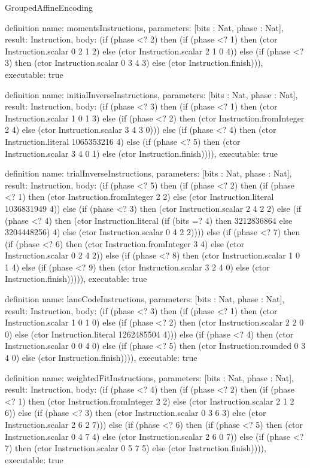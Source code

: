 \begin{lexlean}{GroupedAffineEncoding}
\begin{semanticmodule}
definition{
  name: momentsInstructions,
  parameters: [bits : Nat, phase : Nat],
  result: Instruction,
  body: (if (phase <? 2) then (if (phase <? 1) then (ctor Instruction.scalar 0 2 1 2) else (ctor Instruction.scalar 2 1 0 4)) else (if (phase <? 3) then (ctor Instruction.scalar 0 3 4 3) else (ctor Instruction.finish))),
  executable: true
}

definition{
  name: initialInverseInstructions,
  parameters: [bits : Nat, phase : Nat],
  result: Instruction,
  body: (if (phase <? 3) then (if (phase <? 1) then (ctor Instruction.scalar 1 0 1 3) else (if (phase <? 2) then (ctor Instruction.fromInteger 2 4) else (ctor Instruction.scalar 3 4 3 0))) else (if (phase <? 4) then (ctor Instruction.literal 1065353216 4) else (if (phase <? 5) then (ctor Instruction.scalar 3 4 0 1) else (ctor Instruction.finish)))),
  executable: true
}

definition{
  name: trialInverseInstructions,
  parameters: [bits : Nat, phase : Nat],
  result: Instruction,
  body: (if (phase <? 5) then (if (phase <? 2) then (if (phase <? 1) then (ctor Instruction.fromInteger 2 2) else (ctor Instruction.literal 1036831949 4)) else (if (phase <? 3) then (ctor Instruction.scalar 2 4 2 2) else (if (phase <? 4) then (ctor Instruction.literal (if (bits =? 4) then 3212836864 else 3204448256) 4) else (ctor Instruction.scalar 0 4 2 2)))) else (if (phase <? 7) then (if (phase <? 6) then (ctor Instruction.fromInteger 3 4) else (ctor Instruction.scalar 0 2 4 2)) else (if (phase <? 8) then (ctor Instruction.scalar 1 0 1 4) else (if (phase <? 9) then (ctor Instruction.scalar 3 2 4 0) else (ctor Instruction.finish))))),
  executable: true
}

definition{
  name: laneCodeInstructions,
  parameters: [bits : Nat, phase : Nat],
  result: Instruction,
  body: (if (phase <? 3) then (if (phase <? 1) then (ctor Instruction.scalar 1 0 1 0) else (if (phase <? 2) then (ctor Instruction.scalar 2 2 0 0) else (ctor Instruction.literal 1262485504 4))) else (if (phase <? 4) then (ctor Instruction.scalar 0 0 4 0) else (if (phase <? 5) then (ctor Instruction.rounded 0 3 4 0) else (ctor Instruction.finish)))),
  executable: true
}

definition{
  name: weightedFitInstructions,
  parameters: [bits : Nat, phase : Nat],
  result: Instruction,
  body: (if (phase <? 4) then (if (phase <? 2) then (if (phase <? 1) then (ctor Instruction.fromInteger 2 2) else (ctor Instruction.scalar 2 1 2 6)) else (if (phase <? 3) then (ctor Instruction.scalar 0 3 6 3) else (ctor Instruction.scalar 2 6 2 7))) else (if (phase <? 6) then (if (phase <? 5) then (ctor Instruction.scalar 0 4 7 4) else (ctor Instruction.scalar 2 6 0 7)) else (if (phase <? 7) then (ctor Instruction.scalar 0 5 7 5) else (ctor Instruction.finish)))),
  executable: true
}


\end{semanticmodule}
\end{lexlean}
